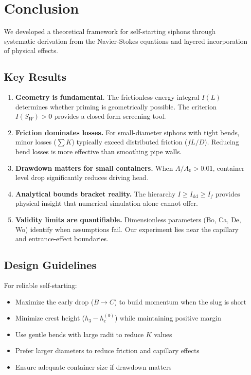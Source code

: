 \documentclass[11pt,a4paper]{article}
\theoremstyle{definition}
\begin{document}
\section{Conclusion}
\label{sec:conclusion}

We developed a theoretical framework for self-starting siphons through systematic derivation from the Navier-Stokes equations and layered incorporation of physical effects.

\subsection{Key Results}

\begin{enumerate}[nosep,leftmargin=2em]
  \item \textbf{Geometry is fundamental.} The frictionless energy integral $I(L)$ determines whether priming is geometrically possible. The criterion $I(S_W) > 0$ provides a closed-form screening tool.

  \item \textbf{Friction dominates losses.} For small-diameter siphons with tight bends, minor losses ($\sum K$) typically exceed distributed friction ($fL/D$). Reducing bend losses is more effective than smoothing pipe walls.

  \item \textbf{Drawdown matters for small containers.} When $A/A_0 > 0.01$, container level drop significantly reduces driving head.

  \item \textbf{Analytical bounds bracket reality.} The hierarchy $I \geq I_{\text{dd}} \geq I_f$ provides physical insight that numerical simulation alone cannot offer.

  \item \textbf{Validity limits are quantifiable.} Dimensionless parameters (Bo, Ca, De, Wo) identify when assumptions fail. Our experiment lies near the capillary and entrance-effect boundaries.
\end{enumerate}

\subsection{Design Guidelines}

For reliable self-starting:
\begin{itemize}[nosep,leftmargin=2em]
  \item Maximize the early drop ($B \to C$) to build momentum when the slug is short
  \item Minimize crest height ($h_3 - h_c^{(0)}$) while maintaining positive margin
  \item Use gentle bends with large radii to reduce $K$ values
  \item Prefer larger diameters to reduce friction and capillary effects
  \item Ensure adequate container size if drawdown matters
\end{itemize}
\end{document}
